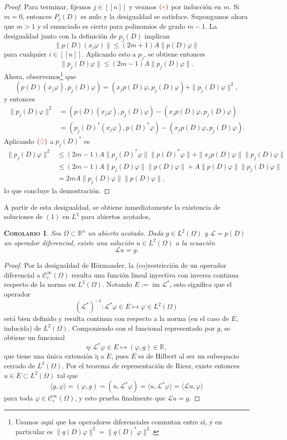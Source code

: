\documentclass[11pt]{article}
\theoremstyle{colored}
\newtheorem{corollary}{\scshape Corolario}
\newcommand{\R}{\mathbb{R}}
\newcommand{\C}{\mathscr{C}}
\newcommand{\im}{\operatorname{im}}
\newcommand{\nat}[1]{[\![#1]\!]}
\newcommand{\ev}[1]{\langle #1 \rangle}
\newcommand{\ip}[1]{( #1 )}
\renewcommand{\L}{\mathscr{L}}
\newcommand{\paint}[1]{\color{color}{#1}}
\newcommand{\tpaint}[1]{\paint{\textbf{#1}}}
\begin{document}
\begin{proof}
Para terminar, fijemos $j \in \nat{n}$ y veamos $\tpaint{($\ast$)}$ por inducción en $m$. Si $m = 0$, entonces $P_j(D)$ es nulo y la desigualdad se satisface. Supongamos ahora que $m > 1$ y el enunciado es cierto para polinomios de grado $m-1$. La desigualdad junto con la definición de $p_j(D)$ implican
\[
\|p(D)(x_i\varphi)\| \leq (2m+1)A\|p(D)\varphi\| \tag{$\lozenge$}
\]
para cualquier $i \in \nat{n}$. Aplicando esto a $p_j$, se obtiene entonces 
\[
\|p_j(D)\varphi\| \leq (2m-1)A\|p_j(D)\varphi\|.
\]
Ahora, observemos\footnote{Usamos aquí que los operadores diferenciales conmutan entre sí, y en particular es $\|q(D)\varphi\|^2 = \|q(D)^\ast \varphi\|^2$.} que
\[
\ip{p(D)(x_j\varphi),p_j(D)\varphi} = \ip{x_jp(D)\varphi,p_j(D)\varphi} + \|p_j(D)\varphi\|^2,
\]
y entonces
\begin{align*}
\|p_j(D)\varphi\|^2 &= \ip{p(D)(x_j\varphi),p_j(D)\varphi} - \ip{x_jp(D)\varphi,p_j(D)\varphi}\\
&= \ip{p_j(D)^\ast(x_j\varphi),p(D)^\ast\varphi} - \ip{x_jp(D)\varphi,p_j(D)\varphi}.
\end{align*}
Aplicando $\tpaint{($\lozenge$)}$ a $p_j(D)^\ast$ es
\begin{align*}
\|p_j(D)\varphi\|^2&\leq (2m-1)A\|p_j(D)^\ast\varphi\|\|p(D)^\ast\varphi\| + \|x_jp(D)\varphi\|\|p_j(D)\varphi\|\\
& \leq (2m-1)A\|p_j(D)\varphi\|\|p(D)\varphi\| + A\|p(D)\varphi\|\|p_j(D)\varphi\|\\
& = 2mA\|p_j(D)\varphi\|\|p(D)\varphi\|,
\end{align*}
lo que concluye la demostración.
\end{proof}

A partir de esta desigualdad, se obtiene inmediatamente la existencia de soluciones de $(1)$ en $L^2$ para abiertos acotados,

\begin{corollary} Sea $\Omega \subset \R^n$ un abierto acotado. Dada $g \in L^2(\Omega)$ y $\L = p(D)$ un operador diferencial, existe una solución $u \in L^2(\Omega)$ a la ecuación
\[
\L u = g.
\]
\end{corollary}
\begin{proof} Por la desigualdad de Hörmander, la (co)restricción de un operador diferencial a $\C_c^\infty(\Omega)$ resulta una función lineal inyectiva con inversa continua respecto de la norma en $L^2(\Omega)$. Notando $E := \im \L^\ast$, esto significa que el operador
\[
(\L^\ast)^{-1} : \L^\ast \varphi \in E \mapsto \varphi \in L^2(\Omega)
\]
está bien definido y resulta continua con respecto a la norma (en el caso de $E$, inducida) de $L^2(\Omega)$. Componiendo con el funcional representado por $g$, se obtiene un funcional
\[
\eta  : \L^\ast\varphi \in E \mapsto \ip{\varphi, g} \in \R,
\]
que tiene una única extensión $\widetilde{\eta}$ a $\overline{E}$, pues $\overline{E}$ es de Hilbert al ser un subespacio cerrado de $L^2(\Omega)$. Por el teorema de representación de Riesz, existe entonces $u \in \overline{E} \subset L^2(\Omega)$ tal que
\[
\ev{g,\varphi} = (\varphi,g) = (u,\L^\ast\varphi) = \ev{u,\L^\ast\varphi} = \ev{\L u, \varphi}
\]
para toda $\varphi \in \C_c^\infty(\Omega)$, y esto prueba finalmente que $\L u = g$.
\end{proof}
\end{document}
